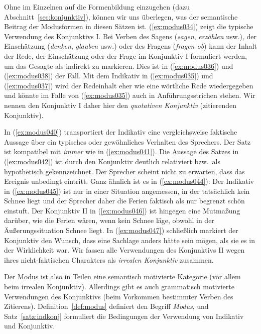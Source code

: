 Ohne im Einzelnen auf die Formenbildung einzugehen (dazu Abschnitt~\ref{sec:konjunktiv}), können wir uns überlegen, was der semantische Beitrag der Modusformen in diesen Sätzen ist.
(\ref{ex:modus034}) zeigt die typische Verwendung des Konjunktivs I.
Bei Verben des Sagens (\textit{sagen}, \textit{erzählen} usw.), der Einschätzung (\textit{denken}, \textit{glauben} usw.) oder des Fragens (\textit{fragen ob}) kann der Inhalt der Rede, der Einschätzung oder der Frage im Konjunktiv I formuliert werden, um das Gesagte als indirekt zu markieren.
Dies ist in (\ref{ex:modus036}) und (\ref{ex:modus038}) der Fall.
Mit dem Indikativ in (\ref{ex:modus035}) und (\ref{ex:modus037}) wird der Redeinhalt eher wie eine wörtliche Rede wiedergegeben und könnte im Falle von (\ref{ex:modus035}) auch in Anführungsstrichen stehen.
Wir nennen den Konjunktiv I daher hier den \textit{quotativen Konjunktiv} (zitierenden Konjunktiv).

In (\ref{ex:modus040}) transportiert der Indikativ eine vergleichsweise faktische Aussage über ein typisches oder gewöhnliches Verhalten des Sprechers.
Der Satz ist kompatibel mit \textit{immer} wie in (\ref{ex:modus041}).
Die Aussage des Satzes in (\ref{ex:modus042}) ist durch den Konjunktiv deutlich relativiert bzw.\ als hypothetisch gekennzeichnet.
Der Sprecher scheint nicht zu erwarten, dass das Ereignis unbedingt eintritt.
Ganz ähnlich ist es in (\ref{ex:modus044}):
Der Indikativ in (\ref{ex:modus045}) ist nur in einer Situation angemessen, in der tatsächlich kein Schnee liegt und der Sprecher daher die Ferien faktisch als nur begrenzt schön einstuft.
Der Konjunktiv II in (\ref{ex:modus046}) ist hingegen eine Mutmaßung darüber, wie die Ferien wären, wenn kein Schnee läge, obwohl in der Äußerungssituation Schnee liegt.
In (\ref{ex:modus047}) schließlich markiert der Konjunktiv den Wunsch, dass eine Sachlage anders hätte sein mögen, als sie es in der Wirklichkeit war.
Wir fassen alle Verwendungen des Konjunktivs II wegen ihres nicht-faktischen Charakters als \textit{irrealen Konjunktiv} zusammen.

Der Modus ist also in Teilen eine semantisch motivierte Kategorie (vor allem beim irrealen Konjunktiv).
Allerdings gibt es auch grammatisch motivierte Verwendungen des Konjunktivs (beim Vorkommen bestimmter Verben des Zitierens).
Definition~\ref{def:modus} definiert den Begriff \textit{Modus}, und Satz~\ref{satz:indkonj} formuliert die Bedingungen der Verwendung von Indikativ und Konjunktiv.


